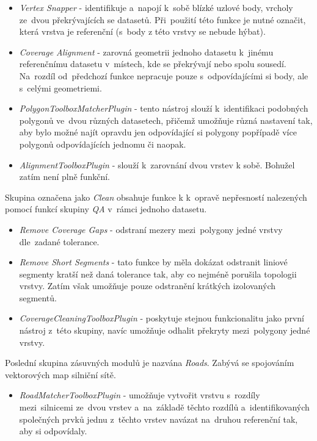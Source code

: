 \begin{itemize}
 \item \textit{Vertex Snapper} - identifikuje a~napojí k~sobě blízké uzlové body, vrcholy ze~dvou překrývajících se datasetů. Při~použití této funkce je nutné označit, 
	která vrstva je referenční (s~body z této vrstvy se nebude hýbat).
 \item \textit{Coverage Alignment} - zarovná geometrii jednoho datasetu k~jinému referenčnímu datasetu v~místech, kde se překrývají nebo spolu sousedí. Na~rozdíl 
	od~předchozí funkce nepracuje pouze s~odpovídajícími si body, ale s~celými geometriemi.
 \item \textit{PolygonToolboxMatcherPlugin} - tento nástroj slouží k~identifikaci podobných polygonů ve~dvou různých datasetech, přičemž umožňuje různá nastavení tak, 
	aby bylo možné najít opravdu jen odpovídající si polygony popřípadě více polygonů odpovídajících jednomu či naopak. %
 \item \textit{AlignmentToolboxPlugin} - slouží k~zarovnání dvou vrstev k sobě. Bohužel zatím není plně funkční. %
\end{itemize}

Skupina označena jako \textit{Clean} obsahuje funkce k k~opravě nepřesností nalezených pomocí funkcí skupiny \textit{QA} v~rámci jednoho datasetu.

\begin{itemize}
 \item \textit{Remove Coverage Gaps} - odstraní mezery mezi~polygony jedné vrstvy dle~zadané tolerance.
 \item \textit{Remove Short Segments} - tato funkce by měla dokázat odstranit liniové segmenty kratší než daná tolerance tak, aby co nejméně porušila topologii vrstvy. 
      Zatím však umožňuje pouze odstranění krátkých izolovaných segmentů.
 \item \textit{CoverageCleaningToolboxPlugin} - poskytuje stejnou funkcionalitu jako první nástroj z~této skupiny, navíc umožňuje odhalit překryty mezi~polygony jedné vrstvy.
\end{itemize}

Poslední skupina zásuvných modulů je nazvána \textit{Roads}. Zabývá se spojováním vektorových map silniční sítě.

\begin{itemize}
 \item \textit{RoadMatcherToolboxPlugin} - umožňuje vytvořit vrstvu s~rozdíly mezi~silnicemi ze~dvou vrstev a~na~základě těchto rozdílů a~identifikovaných společných prvků 
	jednu z~těchto vrstev navázat na~druhou referenční tak, aby si odpovídaly.
\end{itemize}


